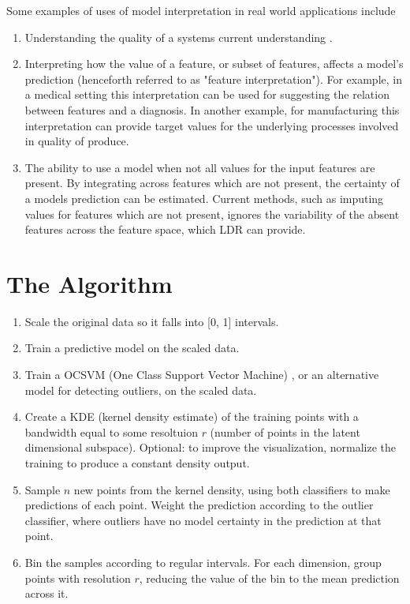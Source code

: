 \documentclass[a4paper, twocolumn]{article}
\begin{document}
Some examples of uses of model interpretation in real world applications include

\begin{enumerate}
\item Understanding the quality of a systems current understanding \cite{amershi2011effective}. 

\item Interpreting how the value of a feature, or subset of features, affects a model's prediction (henceforth referred to as "feature interpretation"). For example, in a medical setting this interpretation can be used for suggesting the relation between features and a diagnosis. In another example, for manufacturing this interpretation can provide target values for the underlying processes involved in quality of produce.

\item The ability to use a model when not all values for the input features are present. By integrating across features which are not present, the certainty of a models prediction can be estimated. Current methods, such as imputing values for features which are not present, ignores the variability of the absent features across the feature space, which LDR can provide.
\end{enumerate}

\section{The Algorithm}

\begin{enumerate}
\item Scale the original data so it falls into [0, 1] intervals.
\item Train a predictive model on the scaled data.
\item Train a OCSVM (One Class Support Vector Machine) \cite{scholkopf2001estimating}, or an alternative model for detecting outliers, on the scaled data.
\item Create a KDE (kernel density estimate) \cite{parzen1962estimation} of the training points with a bandwidth equal to some resoltuion $r$ (number of points in the latent dimensional subspace). Optional: to improve the visualization, normalize the training to produce a constant density output.
\item Sample $n$ new points from the kernel density, using both classifiers to make predictions of each point. Weight the prediction according to the outlier classifier, where outliers have no model certainty in the prediction at that point.
\item Bin the samples according to regular intervals. For each dimension, group points with resolution $r$, reducing the value of the bin to the mean prediction across it.
\end{enumerate}
\end{document}
